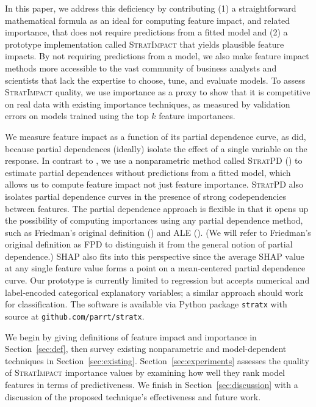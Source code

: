 \documentclass[11pt]{article}
\newcommand{\secref}[1]{Section~\ref{#1}}
\newcommand{\simp}{\fontfamily{cmr}\textsc{\small StratImpact}}
\newcommand{\spd}{\fontfamily{cmr}\textsc{\small StratPD}}
\begin{document}
In this paper, we address this deficiency by contributing (1) a straightforward mathematical formula as an ideal for computing feature impact, and related importance, that does not require predictions from a fitted model and (2) a prototype implementation called \simp{} that yields plausible feature impacts. By not requiring predictions from a model, we also make feature impact methods more accessible to the vast  community of business analysts and scientists that lack the expertise to choose, tune, and evaluate models. To assess \simp{} quality, we use importance as a proxy to show that it is competitive on real data with existing importance techniques, as measured by validation errors on models trained using the top $k$ feature importances.  

We measure feature impact as a function of its partial dependence curve, as \cite{pdvim} did, because partial dependences (ideally) isolate the effect of a single variable on the response. In contrast to \cite{pdvim}, we use a nonparametric method called \spd{} (\citealt{stratpd}) to estimate partial dependences without predictions from a fitted model, which allows us to compute feature impact not just feature importance. \spd{} also isolates partial dependence curves in the presence of strong codependencies between features. The partial dependence approach is flexible in that it opens up the possibility of computing importances using any partial dependence method, such as Friedman's original definition (\citealt{PDP}) and ALE (\citealt{ALE}). (We will refer to Friedman's original definition as FPD to distinguish it from the general notion of partial dependence.) SHAP also fits into this perspective since the average SHAP value at any single feature value forms a point on a mean-centered partial dependence curve. Our prototype is currently limited to regression but accepts numerical and label-encoded categorical explanatory variables; a similar approach should work for classification. The software is available via Python package {\tt stratx} with source at {\tt github.com/parrt/stratx}. 

We begin by giving definitions of feature impact and importance in \secref{sec:def}, then survey existing nonparametric and model-dependent techniques in \secref{sec:existing}. \secref{sec:experiments} assesses the quality of \simp{} importance values by examining how well they rank model features in terms of predictiveness. We finish in \secref{sec:discussion} with a discussion of the proposed technique's effectiveness and future work.
\end{document}
